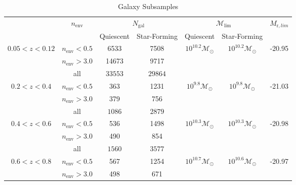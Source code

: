 \documentclass{emulateapj}
\def \lowenvthresh {0.5}
\def \highenvthresh {3.0}
\begin{document}
\begin{table} 
  \caption{Galaxy Subsamples}
  \label{tab:subsample}
  \begin{center}
    \leavevmode
    \begin{tabular}{ccccccc} \hline \hline              
     &\multicolumn{1}{c}{$n_{\mathrm{env}}$}        & \multicolumn{2}{c}{$N_{\mathrm{gal}}$}  & \multicolumn{2}{c}{$\mathcal{M}_{\mathrm{lim}}$} & $M_{\mathrm{r}, lim}$ \\ 
    & & Quiescent & Star-Forming & Quiescent & Star-Forming &  \\ \hline 
$0.05 < z < 0.12$ & $n_{\mathrm{env}} < \lowenvthresh $ & 6533 & 7508 & $10^{10.2} \mathcal{M}_{\odot}$ & $10^{10.2} \mathcal{M}_{\odot}$ & -20.95 \\
               & $n_{\mathrm{env}} > \highenvthresh $ &14673 & 9717 &                          \\ 
                              & all          &$33553$                       & $29864$                          \\ \hline
$0.2 < z < 0.4$      &$n_{\mathrm{env}} < \lowenvthresh $           &363                    &1231 & $10^{9.8} \mathcal{M}_{\odot}$ & $10^{9.8} \mathcal{M}_{\odot}$ &-21.03 \\
               &$n_{\mathrm{env}} > \highenvthresh $            &379                    &756                           \\
               & all                & $1086$                      & $2879$                          \\ \hline
$0.4 < z < 0.6$      &$n_{\mathrm{env}} < \lowenvthresh $           &536                       &1498 & $10^{10.3} \mathcal{M}_{\odot}$ & $10^{10.3} \mathcal{M}_{\odot}$ & -20.98 \\
               &$n_{\mathrm{env}} > \highenvthresh $            &490                       &854                           \\
               & all               & $1560$                      & $3577$                          \\ \hline
$0.6 < z < 0.8$      &$n_{\mathrm{env}} < \lowenvthresh $           &567                       &1254  & $10^{10.7} \mathcal{M}_{\odot}$ & $10^{10.6} \mathcal{M}_{\odot}$ & -20.97 \\
               &$n_{\mathrm{env}} > \highenvthresh $            &498                       &671                           \\

\end{tabular}
\end{center}
\end{table}
\end{document}

